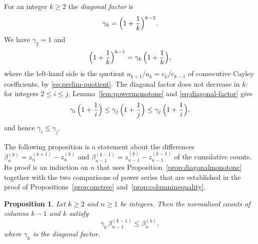 \documentclass{amsart}
\newtheorem{proposition}[theorem]{Proposition}
\theoremstyle{definition}
\theoremstyle{remark}
\numberwithin{equation}{section}
\begin{document}
For an integer $k\ge2$ the \emph{diagonal factor} is
\[
\gamma_k=\Bigl(1+\frac1k\Bigr)^{k-2}.
\]
We have $\gamma_2=1$ and
\begin{equation}\label{eq:diagonal-factor}
\Bigl(1+\frac1k\Bigr)^{k-1}=\gamma_k\,\Bigl(1+\frac1k\Bigr),
\end{equation}
where the left-hand side is the quotient $a_{k+1}/a_k=c_k/c_{k-1}$ of
consecutive Cayley coefficients, by \eqref{eq:prelim-quotient}. The
diagonal factor does not decrease in $k$: for integers $2\le i\le j$,
Lemma~\ref{lem:powermonotone} and \eqref{eq:diagonal-factor} give
\[
\gamma_i\,\Bigl(1+\frac1i\Bigr)\le\gamma_j\,\Bigl(1+\frac1j\Bigr)
\le\gamma_j\,\Bigl(1+\frac1i\Bigr),
\]
and hence $\gamma_i\le\gamma_j$.

The following proposition is a statement about the
differences $\beta^{(k)}_n=z^{(k+1)}_n-z^{(k)}_n$ and
$\beta^{(k-1)}_{n-1}=z^{(k)}_{n-1}-z^{(k-1)}_{n-1}$ of the cumulative counts.
Its proof is an induction on $n$ that uses
Proposition~\ref{prop:diagonalmonotone} together with the
two comparisons of power series that are established in the proof of
Propositions~\ref{prop:onetree} and~\ref{prop:columninequality}.

\begin{proposition}\label{prop:diagonallower}
Let $k\ge2$ and $n\ge1$ be integers. Then the normalised counts of columns
$k-1$ and $k$ satisfy
\[
\gamma_k\,\beta^{(k-1)}_{n-1}\le\beta^{(k)}_n,
\]
where $\gamma_k$ is the diagonal factor.
\end{proposition}
\end{document}
